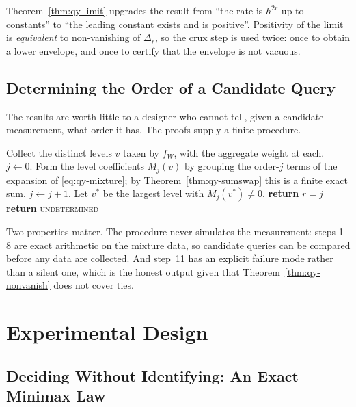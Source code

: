 \documentclass[conference]{IEEEtran}
\theoremstyle{definition}
\begin{document}
Theorem~\ref{thm:qy-limit} upgrades the result from ``the rate is $h^{2r}$ up to constants'' to
``the leading constant exists and is positive''. Positivity of the limit is \emph{equivalent}
to non-vanishing of $\Delta_{r}$, so the crux step is used twice: once to obtain a lower
envelope, and once to certify that the envelope is not vacuous.

\subsection{Determining the Order of a Candidate Query}
\label{sec:qy-procedure}

The results are worth little to a designer who cannot tell, given a candidate measurement,
what order it has. The proofs supply a finite procedure.

\begin{algorithm}[htbp]
\caption{Leakage order of a candidate measurement}
\label{alg:qy-order}
\begin{algorithmic}[1]
\STATE Collect the distinct levels $v$ taken by $f_{W}$, with the aggregate weight at each.
\STATE $j\leftarrow0$.
\REPEAT
  \STATE Form the level coefficients $M_{j}(v)$ by grouping the order-$j$ terms of the
         expansion of \eqref{eq:qy-mixture}; by Theorem~\ref{thm:qy-sumswap} this is a finite
         exact sum.
    \STATE $j\leftarrow j+1$.
  \ENDIF
{}
\STATE Let $v^{*}$ be the largest level with $M_{j}(v^{*})\neq0$.
  \STATE \textbf{return} $r=j$ 
\ELSE
  \STATE \textbf{return} \textsc{undetermined} 
\ENDIF
\end{algorithmic}
\end{algorithm}

Two properties matter. The procedure never simulates the measurement: steps 1--8 are exact
arithmetic on the mixture data, so candidate queries can be compared before any data are
collected. And step~11 has an explicit failure mode rather than a silent one, which is the
honest output given that Theorem~\ref{thm:qy-nonvanish} does not cover ties.


\section{Experimental Design}

\subsection{Deciding Without Identifying: An Exact Minimax Law}
\label{sec:sp-expdesign}
\end{document}

